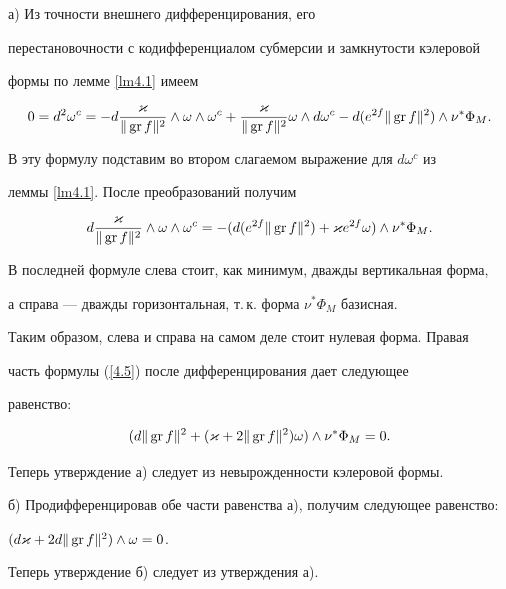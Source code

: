 \begin{pf} а) Из точности внешнего дифференцирования, его


перестановочности с кодифференциалом субмерсии и замкнутости кэлеровой


формы по лемме \ref{lm4.1} имеем


$$


0=d^2\omega^c=-d\frac{\vkap }{\Vert \GR f\Vert^2}\land \omega\land\omega^c


+\frac{\vkap }{\Vert \GR f\Vert^2}\omega \land d\omega^c-


d( e^{2f}\Vert \GR f\Vert^2) \land \nu^*\Phi_M.


$$


В эту формулу подставим во втором слагаемом выражение для $d\omega^c$ из


леммы \ref{lm4.1}. После преобразований получим


\begin{equation}


d\frac{\vkap }{\Vert \GR f\Vert^2}\land \omega \land \omega^c=


-(d(e^{2f}\Vert \GR f \Vert^2)+\vkap e^{2f}\omega) \land


\nu^*\Phi_M.


\label{4.5}


\end{equation}


В последней формуле слева стоит, как минимум, дважды вертикальная форма,


а справа --- дважды горизонтальная, т.\,к. форма $\nu^*\Phi_M$ базисная.


Таким образом, слева и справа на самом деле стоит нулевая форма. Правая


часть формулы (\ref{4.5}) после дифференцирования дает следующее


равенство:


$$


(d\Vert \GR f\Vert^2+(\vkap +2\Vert \GR f\Vert^2)\omega )\land \nu^*\Phi_M


=0.


$$


Теперь утверждение а) следует из невырожденности кэлеровой формы.





б) Продифференцировав обе части равенства а), получим следующее равенство:


$(d\varkappa +2d\Vert \operatorname{gr} f\Vert^2)\land \omega =0$.


Теперь утверждение б) следует из утверждения а).


\end{pf}






